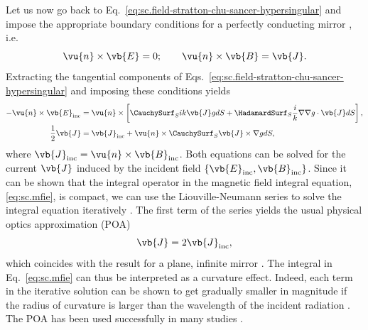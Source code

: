 \documentclass[11pt,SymmetricalJury]{inrsthesis/inrsthesis}
\begin{document}
Let us now go back to Eq.~\eqref{eq:sc.field-stratton-chu-sancer-hypersingular} and
impose the appropriate boundary conditions for a perfectly
conducting mirror \cite[Eq. (1.18)]{Stratton1941}, i.e.
  \begin{equation}
    \label{eq:sc.boundaryConditions}
    \vu{n}\times\vb{E}=0;\qquad \vu{n}\times\vb{B}=\vb{J}.
  \end{equation}
Extracting the tangential components of Eqs.~\eqref{eq:sc.field-stratton-chu-sancer-hypersingular}
and imposing these conditions yields
  \begin{subequations}
  \begin{align}
    -\vu{n}\times\vb{E}_\text{inc} &= \vu{n}\times\left[\CauchySurf_S ik\vb{J}g dS + \HadamardSurf_S\frac{i}{k}\nabla\nabla g\cdot\vb{J} dS\right],\\
    \label{eq:sc.mfie}
    \frac{1}{2}\vb{J}  &= \vb{J}_\text{inc} + \vu{n}\times\CauchySurf_S \vb{J}\times\nabla gdS,
  \end{align}
  \end{subequations}
where $\vb{J}_\text{inc}=\vu{n}\times\vb{B}_\text{inc}$.
Both equations can be solved for the current $\vb{J}$ induced by the incident
field $\{\vb{E}_\text{inc},\vb{B}_\text{inc}\}$. Since it can be shown that
the integral operator in the magnetic field integral equation, \eqref{eq:sc.mfie},
is compact, we can use the Liouville-Neumann series to solve the integral equation
iteratively \cite[\S6.16]{Jones1994}. The first term of the series yields the usual
physical optics approximation (POA)
  \begin{equation}
    \label{eq:sc.poa}
    \vb{J} = 2\vb{J}_\text{inc},
  \end{equation}
which coincides with the result for a plane, infinite mirror \cite[\S12.2]{Bladel2007}. The
integral in Eq.~\eqref{eq:sc.mfie} can thus be interpreted as a curvature effect.
Indeed, each term in the iterative solution can be shown to get gradually smaller
in magnitude if the radius of curvature is larger than the wavelength of the
incident radiation \cite{Cullen1958,Bladel2007}.
The POA has been used successfully in many studies \cite{Bouwkamp1954,Love1978}.
\end{document}
